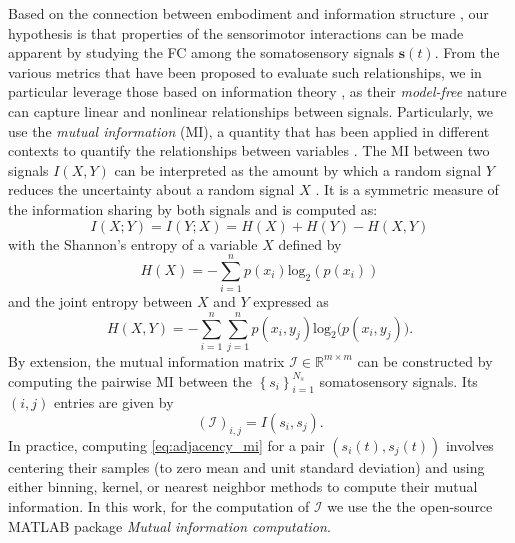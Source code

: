 Based on the connection between embodiment and information structure \cite{Pfeifer2007Selforganizationembodiment}, our hypothesis is that properties of the sensorimotor interactions can be made apparent by studying the FC among the somatosensory signals $ \bm{s}(t) $. From the various metrics that have been proposed to evaluate such relationships, we in particular leverage those based on information theory \cite{Bonsignorio2020EntropyBasedMetrics,Bonsignorio2013Quantifyingevolutionaryself}, as their \emph{model-free} nature can capture linear and nonlinear relationships between signals. Particularly, we use the \emph{mutual information} (MI), a quantity that has been applied in different contexts to quantify the relationships between variables \cite{Steuer2002mutualinformationdetecting}. The MI between two signals $ I\left(X,Y\right) $ can be interpreted as the amount by which a random signal $ Y $ reduces the uncertainty about a random signal $ X $ \cite{Cover1999Elementsinformationtheory}. It is a symmetric measure of the information sharing by both signals and is computed as:
\begin{equation}\label{eq:mutual_information}
	I\left(X;Y\right) =I\left(Y;X\right) = H(X) + H(Y) - H(X,Y)
\end{equation}
with the Shannon's entropy of a variable $X$ defined by 
\begin{equation}\label{eq:entropy}
	H(X) = -\sum_{i=1}^{n}p(x_i)\text{log}_2\left(p\left(x_i\right)\right)
\end{equation}
and the joint entropy between $ X $ and $ Y $ expressed as
\begin{equation}\label{eq:joint_entropy}
	H(X,Y) = -\sum_{i=1}^{n}\sum_{j=1}^{n} p(x_i,y_j)\text{log}_2\big(p\left(x_i,y_j\right)\big).
\end{equation}
By extension, the mutual information matrix $\bm{\mathcal{I}} \in \mathbb{R}^{m \times m}$ can be constructed by computing the pairwise MI between the $\left\lbrace s_i\right\rbrace^{N_s}_{i=1}$ somatosensory signals. Its $(i,j)$ entries are given by
\begin{equation}\label{eq:adjacency_mi}
	(\bm{\mathcal{I}})_{i,j} = I(s_i,s_j).
\end{equation}
In practice, computing \eqref{eq:adjacency_mi}  for a pair $\left({s}_i(t),{s}_j(t)\right)$ involves centering their samples (to zero mean and unit standard deviation) and using either binning, kernel, or nearest neighbor methods \cite{WaltersWilliams2009Estimationmutualinformation} to compute their mutual information. In this work, for the computation of $\bm{\mathcal{I}}$ we use the the open-source MATLAB package \emph{Mutual information computation}\cite{PengMutualInformationcomputation}.

